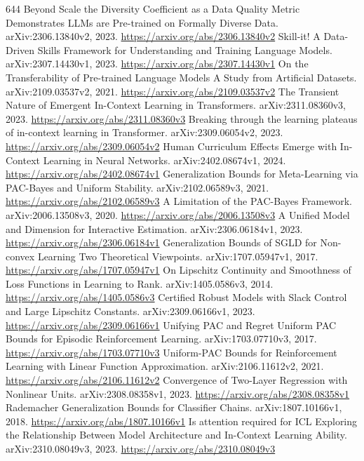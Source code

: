 \documentclass[11pt]{article}
\begin{document}
\begin{thebibliography}{644}
 Beyond Scale the Diversity Coefficient as a Data Quality Metric Demonstrates LLMs are Pre-trained on Formally Diverse Data. arXiv:2306.13840v2, 2023. \url{https://arxiv.org/abs/2306.13840v2}
 Skill-it! A Data-Driven Skills Framework for Understanding and Training Language Models. arXiv:2307.14430v1, 2023. \url{https://arxiv.org/abs/2307.14430v1}
 On the Transferability of Pre-trained Language Models A Study from Artificial Datasets. arXiv:2109.03537v2, 2021. \url{https://arxiv.org/abs/2109.03537v2}
 The Transient Nature of Emergent In-Context Learning in Transformers. arXiv:2311.08360v3, 2023. \url{https://arxiv.org/abs/2311.08360v3}
 Breaking through the learning plateaus of in-context learning in Transformer. arXiv:2309.06054v2, 2023. \url{https://arxiv.org/abs/2309.06054v2}
 Human Curriculum Effects Emerge with In-Context Learning in Neural Networks. arXiv:2402.08674v1, 2024. \url{https://arxiv.org/abs/2402.08674v1}
 Generalization Bounds for Meta-Learning via PAC-Bayes and Uniform Stability. arXiv:2102.06589v3, 2021. \url{https://arxiv.org/abs/2102.06589v3}
 A Limitation of the PAC-Bayes Framework. arXiv:2006.13508v3, 2020. \url{https://arxiv.org/abs/2006.13508v3}
 A Unified Model and Dimension for Interactive Estimation. arXiv:2306.06184v1, 2023. \url{https://arxiv.org/abs/2306.06184v1}
 Generalization Bounds of SGLD for Non-convex Learning Two Theoretical Viewpoints. arXiv:1707.05947v1, 2017. \url{https://arxiv.org/abs/1707.05947v1}
 On Lipschitz Continuity and Smoothness of Loss Functions in Learning to Rank. arXiv:1405.0586v3, 2014. \url{https://arxiv.org/abs/1405.0586v3}
 Certified Robust Models with Slack Control and Large Lipschitz Constants. arXiv:2309.06166v1, 2023. \url{https://arxiv.org/abs/2309.06166v1}
 Unifying PAC and Regret Uniform PAC Bounds for Episodic Reinforcement Learning. arXiv:1703.07710v3, 2017. \url{https://arxiv.org/abs/1703.07710v3}
 Uniform-PAC Bounds for Reinforcement Learning with Linear Function Approximation. arXiv:2106.11612v2, 2021. \url{https://arxiv.org/abs/2106.11612v2}
 Convergence of Two-Layer Regression with Nonlinear Units. arXiv:2308.08358v1, 2023. \url{https://arxiv.org/abs/2308.08358v1}
 Rademacher Generalization Bounds for Classifier Chains. arXiv:1807.10166v1, 2018. \url{https://arxiv.org/abs/1807.10166v1}
 Is attention required for ICL Exploring the Relationship Between Model Architecture and In-Context Learning Ability. arXiv:2310.08049v3, 2023. \url{https://arxiv.org/abs/2310.08049v3}

\end{thebibliography}
\end{document}
